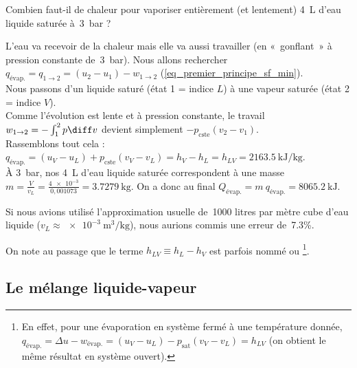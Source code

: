 			\begin{anexample}
			
			Combien faut-il de chaleur pour vaporiser entièrement (et lentement) \SI{4}{\liter} d’eau liquide saturée à~\SI{3}{\bar} ?
			
				\begin{answer}
					L’eau va recevoir de la chaleur mais elle va aussi travailler (en «~gonflant~» à pression constante de~\SI{3}{\bar}). Nous allons rechercher $q_\text{évap.} = q_{1 \to 2} = (u_2 - u_1) - w_{1 \to 2}$ (\ref{eq_premier_principe_sf_min}).\\
					Nous passons d’un liquide saturé (état 1 = indice $L$) à une vapeur saturée (état 2 = indice $V$).\\
					Comme l’évolution est lente et à pression constante, le travail $w_{1 \to 2} = -\int_1^2 p \diff v$ devient simplement $-p_\text{cste} (v_2 - v_1) $.\\
					Rassemblons tout cela : $q_\text{évap.} = (u_V - u_L) + p_\text{cste} (v_V - v_L) = h_V - h_L = h_{LV} = \SI{2163,5}{\kilo\joule\per\kilogram}$.\\
					À \SI{3}{\bar}, nos \SI{4}{\liter} d’eau liquide saturée correspondent à une masse $m = \frac{V}{v_L} = \frac{\num{4e-3}}{0,001073} = \SI{3,7279}{\kilogram} $. On a donc au final $Q_\text{évap.} = m \ q_\text{évap.} = \SI{8065,2}{\kilo\joule}$.
				\begin{remark}Si nous avions utilisé l’approximation usuelle de~\num{1000} litres par mètre cube d’eau liquide ($v_L \approx \SI{e-3}{\metre\cubed\per\kilogram}$), nous aurions commis une erreur de~\num{+7,3}\%.\end{remark}\end{answer}
			\end{anexample}

		\onlyamphibook{\clearpage}%
		On note au passage que le terme $h_{LV} \equiv h_L - h_V$ est parfois nommé  ou \footnote{En effet, pour une évaporation en système fermé à une température donnée, $q_\text{évap.} = \Delta u - w_\text{évap.} = (u_V - u_L) - p_\text{sat} (v_V - v_L) = h_{LV} $ (on obtient le même résultat en système ouvert).}\nolinebreak.




	\subsection{Le mélange liquide-vapeur}
	\label{ch_melange_liquide_vapeur}
	

